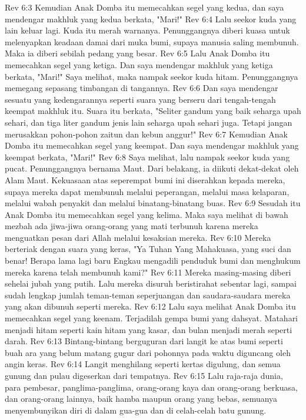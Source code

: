 Rev 6:3  Kemudian Anak Domba itu memecahkan segel yang kedua, dan saya mendengar makhluk yang kedua berkata, "Mari!"
Rev 6:4  Lalu seekor kuda yang lain keluar lagi. Kuda itu merah warnanya. Penunggangnya diberi kuasa untuk melenyapkan keadaan damai dari muka bumi, supaya manusia saling membunuh. Maka ia diberi sebilah pedang yang besar.
Rev 6:5  Lalu Anak Domba itu memecahkan segel yang ketiga. Dan saya mendengar makhluk yang ketiga berkata, "Mari!" Saya melihat, maka nampak seekor kuda hitam. Penunggangnya memegang sepasang timbangan di tangannya.
Rev 6:6  Dan saya mendengar sesuatu yang kedengarannya seperti suara yang berseru dari tengah-tengah keempat makhluk itu. Suara itu berkata, "Seliter gandum yang baik seharga upah sehari, dan tiga liter gandum jenis lain seharga upah sehari juga. Tetapi jangan merusakkan pohon-pohon zaitun dan kebun anggur!"
Rev 6:7  Kemudian Anak Domba itu memecahkan segel yang keempat. Dan saya mendengar makhluk yang keempat berkata, "Mari!"
Rev 6:8  Saya melihat, lalu nampak seekor kuda yang pucat. Penunggangnya bernama Maut. Dari belakang, ia diikuti dekat-dekat oleh Alam Maut. Kekuasaan atas seperempat bumi ini diserahkan kepada mereka, supaya mereka dapat membunuh melalui peperangan, melalui masa kelaparan, melalui wabah penyakit dan melalui binatang-binatang buas.
Rev 6:9  Sesudah itu Anak Domba itu memecahkan segel yang kelima. Maka saya melihat di bawah mezbah ada jiwa-jiwa orang-orang yang mati terbunuh karena mereka menguatkan pesan dari Allah melalui kesaksian mereka.
Rev 6:10  Mereka berteriak dengan suara yang keras, "Ya Tuhan Yang Mahakuasa, yang suci dan benar! Berapa lama lagi baru Engkau mengadili penduduk bumi dan menghukum mereka karena telah membunuh kami?"
Rev 6:11  Mereka masing-masing diberi sehelai jubah yang putih. Lalu mereka disuruh beristirahat sebentar lagi, sampai sudah lengkap jumlah teman-teman seperjuangan dan saudara-saudara mereka yang akan dibunuh seperti mereka.
Rev 6:12  Lalu saya melihat Anak Domba itu memecahkan segel yang keenam. Terjadilah gempa bumi yang dahsyat. Matahari menjadi hitam seperti kain hitam yang kasar, dan bulan menjadi merah seperti darah.
Rev 6:13  Bintang-bintang berguguran dari langit ke atas bumi seperti buah ara yang belum matang gugur dari pohonnya pada waktu diguncang oleh angin keras.
Rev 6:14  Langit menghilang seperti kertas digulung, dan semua gunung dan pulau digeserkan dari tempatnya.
Rev 6:15  Lalu raja-raja dunia, para pembesar, panglima-panglima, orang-orang kaya dan orang-orang berkuasa, dan orang-orang lainnya, baik hamba maupun orang yang bebas, semuanya menyembunyikan diri di dalam gua-gua dan di celah-celah batu gunung.
